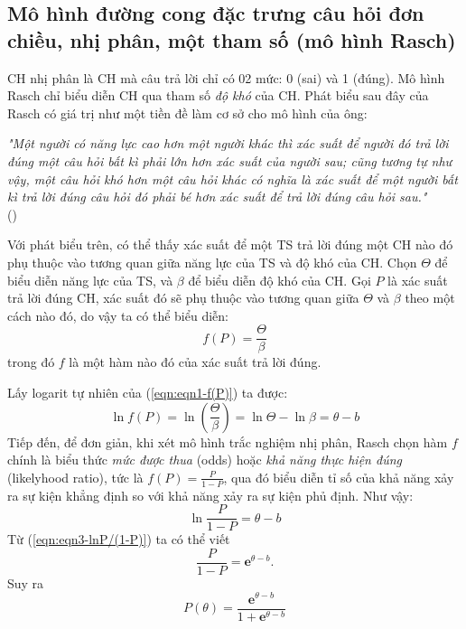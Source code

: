\subsection{Mô hình đường cong đặc trưng câu hỏi đơn chiều, nhị phân, một tham số (mô hình Rasch)}
CH nhị phân là CH mà câu trả lời chỉ có 02 mức: 0 (sai) và 1 (đúng). Mô hình Rasch chỉ biểu diễn CH qua tham số \textit{độ khó} của CH. Phát biểu sau đây của Rasch có giá trị như một tiền đề làm cơ sở cho mô hình của ông:
\begin{flushright}
\textit{"Một người có năng lực cao hơn một người khác thì xác suất để người đó trả lời đúng một câu hỏi bất kì phải lớn hơn xác suất của người sau; cũng tương tự như vậy, một câu hỏi khó hơn một câu hỏi khác có nghĩa là xác suất để một người bất kì trả lời đúng câu hỏi đó phải bé hơn xác suất để trả lời đúng câu hỏi sau."}\\(\cite{rasch1993probabilistic})
\end{flushright}
Với phát biểu trên, có thể thấy xác suất để một TS trả lời đúng một CH nào đó phụ thuộc vào tương quan giữa năng lực của TS và độ khó của CH. Chọn $\Theta$ để biểu diễn năng lực của TS, và $\beta$ để biểu diễn độ khó của CH. Gọi $P$ là xác suất trả lời đúng CH, xác suất đó sẽ phụ thuộc vào tương quan giữa $\Theta$ và $\beta$ theo một cách nào đó, do vậy ta có thể biểu diễn:
\begin{equation}\label{eqn:eqn1-f(P)}
	f(P)=\frac{\Theta}{\beta}
\end{equation}
trong đó $f$ là một hàm nào đó của xác suất trả lời đúng.\par
Lấy logarit tự nhiên của (\ref{eqn:eqn1-f(P)}) ta được:
\begin{equation}\label{eqn:eqn2-lnf(P)}
	\ln f(P)=\ln\left(\frac{\Theta}{\beta}\right)=\ln\Theta-\ln\beta=\theta-b
\end{equation}
Tiếp đến, để đơn giản, khi xét mô hình trắc nghiệm nhị phân, Rasch chọn hàm $f$ chính là biểu thức \textit{mức được thua} (odds) hoặc \textit{khả năng thực hiện đúng} (likelyhood ratio), tức là $f(P)=\frac{P}{1-P}$, qua đó biểu diễn tỉ số của khả năng xảy ra sự kiện khẳng định so với khả năng xảy ra sự kiện phủ định. Như vậy:
\begin{equation}\label{eqn:eqn3-lnP/(1-P)}
	\ln\frac{P}{1-P}=\theta-b
\end{equation}
Từ (\ref{eqn:eqn3-lnP/(1-P)}) ta có thể viết $$\frac{P}{1-P}=\mathbf{e}^{\theta-b}.$$
Suy ra
\begin{equation}\label{eqn:eqn4-P(theta)}
	P(\theta)=\frac{\mathbf{e}^{\theta-b}}{1+\mathbf{e}^{\theta-b}}
\end{equation}
